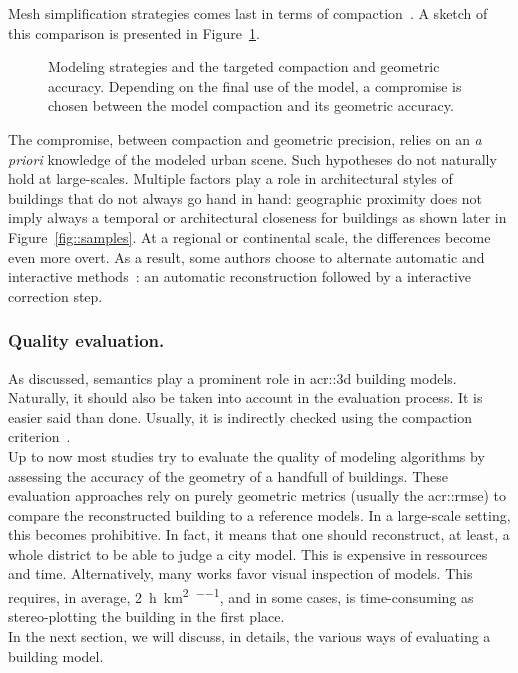             Mesh simplification strategies comes last in terms of compaction~\parencite{zhou20102,verdie2015lod}.
            A sketch of this comparison is presented in Figure~\ref{fig::modeling_strategies}.\\
            \begin{figure}[htb]
                \centering
                            
                \caption[
                    Modeling strategies and the targeted compaction and geometric accuracy.
                ]{
                    \label{fig::modeling_strategies}
                    Modeling strategies and the targeted compaction and geometric accuracy.
                    Depending on the final use of the model, a compromise is chosen between the model compaction and its geometric accuracy.
                }
            \end{figure}
            The compromise, between compaction and geometric precision, relies on an \textit{a priori} knowledge of the modeled urban scene.
            Such hypotheses do not naturally hold at large-scales.
            Multiple factors play a role in architectural styles of buildings that do not always go hand in hand: geographic proximity does not imply always a temporal or architectural closeness for buildings as shown later in Figure~\ref{fig::samples}.
            At a regional or continental scale, the differences become even more overt.
            As a result, some authors choose to alternate automatic and interactive methods~\parencite{musialski2013survey}: an automatic reconstruction followed by a interactive correction step.
        
        \subsubsection{Quality evaluation.}
            As discussed, semantics play a prominent role in \gls{acr::3d} building models.
            Naturally, it should also be taken into account in the evaluation process.
            It is easier said than done.
            Usually, it is indirectly checked using the compaction criterion~\parencite{lafarge2012creating}.\\
            Up to now most studies try to evaluate the quality of modeling algorithms by assessing the accuracy of the geometry of a handfull of buildings.
            These evaluation approaches rely on purely geometric metrics (usually the \gls{acr::rmse}) to compare the reconstructed building to a reference models.
            In a large-scale setting, this becomes prohibitive.
            In fact, it means that one should reconstruct, at least, a whole district to be able to judge a city model.
            This is expensive in ressources and time.
            Alternatively, many works favor visual inspection of models.
            This requires, in average, \SI[per-mode=repeated-symbol]{2}{\hour\per\km\squared\per\expert}, and in some cases, is time-consuming  as stereo-plotting the building in the first place.\\
            In the next section, we will discuss, in details, the various ways of evaluating a building model.

